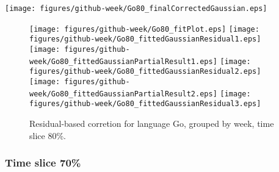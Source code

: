 \begin{center}
{\texttt{[image: figures/github-week/Go80\_finalCorrectedGaussian.eps]}}
\end{center}

\FloatBarrier

\begin{figure}[t]
\centering
{}
{\texttt{[image: figures/github-week/Go80\_fitPlot.eps]}}
{\texttt{[image: figures/github-week/Go80\_fittedGaussianResidual1.eps]}}
{\texttt{[image: figures/github-week/Go80\_fittedGaussianPartialResult1.eps]}}
{\texttt{[image: figures/github-week/Go80\_fittedGaussianResidual2.eps]}}
{\texttt{[image: figures/github-week/Go80\_fittedGaussianPartialResult2.eps]}}
{\texttt{[image: figures/github-week/Go80\_fittedGaussianResidual3.eps]}}
\caption{Residual-based corretion for language Go, grouped by week, time slice 80\%.}
\end{figure}


\FloatBarrier


\subsubsection{Time slice 70\%}

